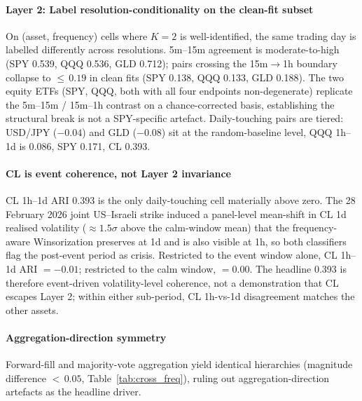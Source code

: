 \documentclass[preprint,12pt,authoryear]{elsarticle}
\begin{document}
\paragraph{Layer 2: Label resolution-conditionality on the clean-fit subset} On (asset, frequency) cells where $K{=}2$ is well-identified, the same trading day is labelled differently across resolutions. 5m--15m agreement is moderate-to-high (SPY 0.539, QQQ 0.536, GLD 0.712); pairs crossing the 15m$\to$1h boundary collapse to ${\le}\,0.19$ in clean fits (SPY 0.138, QQQ 0.133, GLD 0.188). The two equity ETFs (SPY, QQQ, both with all four endpoints non-degenerate) replicate the 5m--15m / 15m--1h contrast on a chance-corrected basis, establishing the structural break is not a SPY-specific artefact. Daily-touching pairs are tiered: USD/JPY ($-0.04$) and GLD ($-0.08$) sit at the random-baseline level, QQQ 1h--1d is 0.086, SPY 0.171, CL 0.393.

\paragraph{CL is event coherence, not Layer 2 invariance} CL 1h--1d ARI 0.393 is the only daily-touching cell materially above zero. The 28 February 2026 joint US--Israeli strike induced a panel-level mean-shift in CL 1d realised volatility ($\approx 1.5\sigma$ above the calm-window mean) that the frequency-aware Winsorization preserves at 1d and is also visible at 1h, so both classifiers flag the post-event period as crisis. Restricted to the event window alone, CL 1h--1d ARI $=-0.01$; restricted to the calm window, $=0.00$. The headline 0.393 is therefore event-driven volatility-level coherence, not a demonstration that CL escapes Layer 2; within either sub-period, CL 1h-vs-1d disagreement matches the other assets.

\paragraph{Aggregation-direction symmetry} Forward-fill and majority-vote aggregation yield identical hierarchies (magnitude difference $<\,0.05$, Table~\ref{tab:cross_freq}), ruling out aggregation-direction artefacts as the headline driver.
\end{document}
